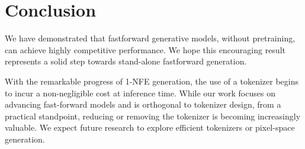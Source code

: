 \section{Conclusion}

We have demonstrated that fastforward generative models, without pretraining, can achieve highly competitive performance. We hope this encouraging result represents a solid step towards stand-alone fastforward generation.

With the remarkable progress of 1-NFE generation, the use of a tokenizer begins to incur a non-negligible cost at inference time. 
While our work focuses on advancing fast-forward models and is orthogonal to tokenizer design, from a practical standpoint, reducing or removing the tokenizer is becoming increasingly valuable.
We expect future research to explore efficient tokenizers or pixel-space generation.